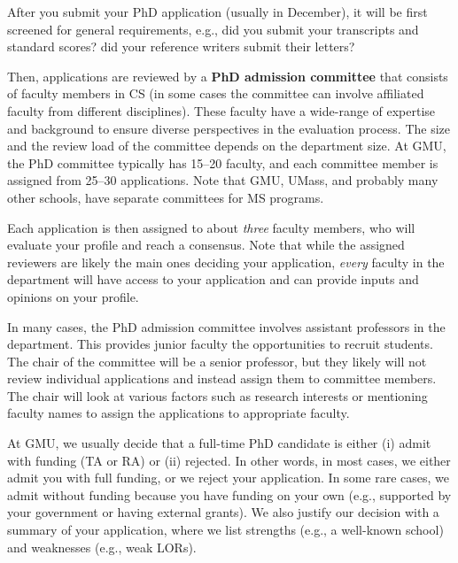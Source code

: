 \documentclass[11pt]{article}
\newcommand{\mycomment}[3][\color{blue}]{{#1{{#2}: {#3}}}}
\newcommand{\didi}[1]{\mycomment{Didier}{#1}}{}
\begin{document}
After you submit your PhD application (usually in December), it will be first screened
for general requirements, e.g., did you submit your transcripts and standard scores? did your reference writers submit their letters?

Then, applications are reviewed by a \textbf{PhD admission committee} that consists of faculty members in CS (in some cases the committee can involve affiliated faculty from different disciplines). These faculty have a wide-range of expertise and background to ensure diverse perspectives in the evaluation process. The size and the review load of the committee depends on the department size. At GMU, the PhD committee typically has 15--20 faculty, and each committee member is assigned from 25--30 applications. Note that GMU, UMass, and probably many other schools, have separate committees for MS programs.

Each application is then assigned to about \emph{three} faculty members, who will evaluate your profile and reach a consensus.  Note that while the assigned reviewers are likely the main ones deciding your application, \emph{every} faculty in the department will have access to your application and can provide inputs and opinions on your profile.

In many cases, the PhD admission committee involves assistant professors in the department. This provides junior faculty the opportunities to recruit students. The chair of the committee will be a senior professor, but they likely will not review individual applications and instead assign them to committee members. The chair will look at various factors such as research interests or mentioning faculty names to assign the applications to appropriate faculty. 

At GMU, we usually decide that a full-time PhD candidate is either (i) admit with funding (TA or RA) or (ii) rejected. In other words, in most cases, we either
admit you with full funding, or we reject your application. In some rare cases, we admit
without funding because you have funding on your own (e.g.,
supported by your government or having external grants). We also justify
our decision with a summary of your application, where we list
strengths (e.g., a well-known school) and weaknesses (e.g., weak
LORs). 

\end{document}
